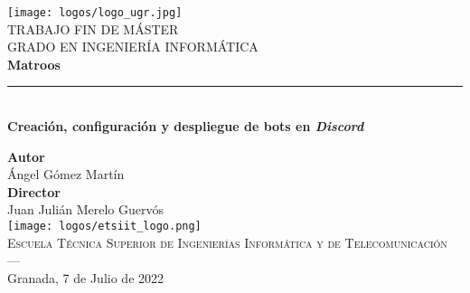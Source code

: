 \begin{titlepage}
\newlength{\centeroffset}
\setlength{\centeroffset}{-0.5\oddsidemargin}
\addtolength{\centeroffset}{0.5\evensidemargin}
\thispagestyle{empty}

\noindent\hspace*{\centeroffset}\begin{minipage}{\textwidth}

\centering
\texttt{[image: logos/logo\_ugr.jpg]}\\[1.4cm]

\textsc{ \Large TRABAJO FIN DE MÁSTER\\[0.2cm]}
\textsc{ GRADO EN INGENIERÍA INFORMÁTICA}\\[1cm]

{\Huge\bfseries Matroos \\}
\noindent\rule[-1ex]{\textwidth}{3pt}\\[3.5ex]
{\large\bfseries Creación, configuración y despliegue de bots en \textit{Discord} }
\end{minipage}

\vspace{2.5cm}
\noindent\hspace*{\centeroffset}
\begin{minipage}{\textwidth}
\centering

\textbf{Autor}\\ {Ángel Gómez Martín}\\[2.5ex]
\textbf{Director}\\ {Juan Julián Merelo Guervós}\\[2cm]
\texttt{[image: logos/etsiit\_logo.png]}\\[0.1cm]
\textsc{Escuela Técnica Superior de Ingenierías Informática y de Telecomunicación}\\
\textsc{---}\\
Granada, 7 de Julio de 2022
\end{minipage}
\end{titlepage}
